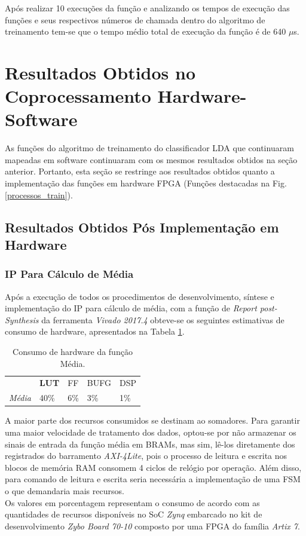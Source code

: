 Após realizar 10 execuções da função e analizando os tempos de execução das funções e seus respectivos números de chamada dentro do algoritmo de treinamento tem-se que o tempo médio total de execução da função é de 640 $\mu$s.

\section{Resultados Obtidos no Coprocessamento Hardware-Software}
As funções do algoritmo de treinamento do classificador LDA que continuaram mapeadas em software continuaram com os mesmos resultados obtidos na seção anterior. Portanto, esta seção se restringe aos resultados obtidos quanto a implementação das funções em hardware FPGA (Funções destacadas na Fig. \ref{processos_train}).

\subsection{Resultados Obtidos Pós Implementação em Hardware}
\subsubsection{IP Para Cálculo de Média}

Após a execução de todos os procedimentos de desenvolvimento, síntese e implementação do IP para cálculo de média, com a função de \textit{Report post-Synthesis} da ferramenta \textit{Vivado 2017.4} obteve-se os seguintes estimativas de consumo de hardware, apresentados na Tabela \ref{consumo_media}.

\begin{table}[!h]
	\centering
	\caption{Consumo de hardware da função Média.}
	\label{consumo_media}
\begin{tabular}{lllll}
	\rowcolor[HTML]{ECF4FF} 
	\multicolumn{1}{c}{\cellcolor[HTML]{ECF4FF}\textbf{}} & \multicolumn{1}{c}{\cellcolor[HTML]{ECF4FF}\textbf{LUT}} & FF  & BUFG & DSP \\
	\textit{Média}                                        & 40\%                                                     & 6\% & 3\%  & 1\%
\end{tabular}
\end{table}

A maior parte dos recursos consumidos se destinam ao somadores. Para garantir uma maior velocidade de tratamento dos dados, optou-se por não armazenar os sinais de entrada da função média em BRAMs, mas sim, lê-los diretamente dos registrados do barramento \textit{AXI-4Lite}, pois o processo de leitura e escrita nos blocos de memória RAM consomem 4 ciclos de relógio por operação. Além disso, para comando de leitura e escrita seria necessária a implementação de uma FSM o que demandaria mais recursos.\\
Os valores em porcentagem representam o consumo de acordo com as quantidades de recursos disponíveis no SoC \textit{Zynq} embarcado no kit de desenvolvimento \textit{Zybo Board 70-10} composto por uma FPGA do família \textit{Artix 7}.

